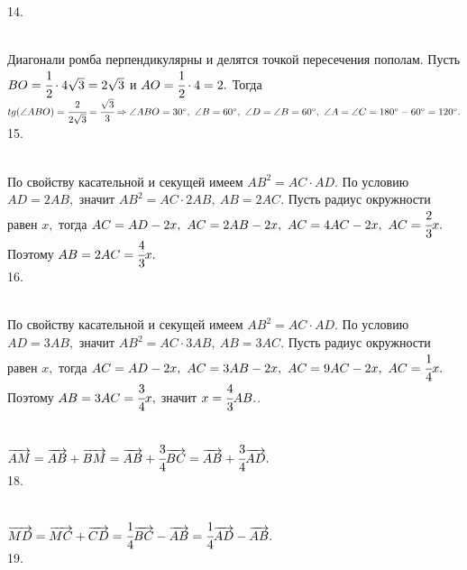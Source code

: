 14. \begin{figure}[ht!]
\end{figure}\\
Диагонали ромба перпендикулярны и делятся точкой пересечения пополам. Пусть $BO=\cfrac{1}{2}\cdot4\sqrt{3}=2\sqrt{3}$ и $AO=\cfrac{1}{2}\cdot4=2.$ Тогда $tg(\angle ABO)=\cfrac{2}{2\sqrt{3}}=\cfrac{\sqrt{3}}{3}\Rightarrow \angle ABO =30^\circ,\ \angle B=60^\circ,\ \angle D=\angle B=60^\circ,\ \angle A=\angle C=180^\circ-60^\circ=120^\circ.$\\
15. \begin{figure}[ht!]
\end{figure}\\
По свойству касательной и секущей имеем $AB^2=AC\cdot AD.$ По условию $AD=2AB,$ значит $AB^2=AC\cdot2AB,\ AB=2AC.$ Пусть радиус окружности равен $x,$ тогда $AC=AD-2x,\ AC=2AB-2x,\ AC=4AC-2x,\ AC=\cfrac{2}{3}x.$ Поэтому $AB=2AC=\cfrac{4}{3}x.$\\
16. \begin{figure}[ht!]
\end{figure}\\
По свойству касательной и секущей имеем $AB^2=AC\cdot AD.$ По условию $AD=3AB,$ значит $AB^2=AC\cdot3AB,\ AB=3AC.$ Пусть радиус окружности равен $x,$ тогда $AC=AD-2x,\ AC=3AB-2x,\ AC=9AC-2x,\ AC=\cfrac{1}{4}x.$ Поэтому $AB=3AC=\cfrac{3}{4}x,$ значит $x=\cfrac{4}{3}AB.$\newpage{}. \begin{figure}[ht!]
\end{figure}\\
$\overrightarrow{AM}=\overrightarrow{AB}+\overrightarrow{BM}=\overrightarrow{AB}+\cfrac{3}{4}\overrightarrow{BC}=
\overrightarrow{AB}+\cfrac{3}{4}\overrightarrow{AD}.$\\
18. \begin{figure}[ht!]
\end{figure}\\
$\overrightarrow{MD}=\overrightarrow{MC}+\overrightarrow{CD}=\cfrac{1}{4}\overrightarrow{BC}-\overrightarrow{AB}=
\cfrac{1}{4}\overrightarrow{AD}-\overrightarrow{AB}.$\\
19. \begin{figure}[ht!]
\end{figure}\\
